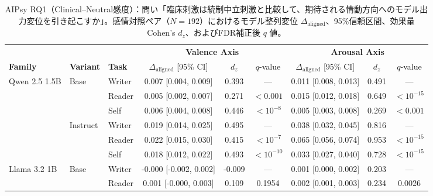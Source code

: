 
\begin{table}[htbp]
\centering
\small
\caption{AIPsy RQ1（Clinical--Neutral感度）：問い「臨床刺激は統制中立刺激と比較して、期待される情動方向へのモデル出力変位を引き起こすか」。感情対照ペア（$N=192$）におけるモデル整列変位 $\Delta_{\text{aligned}}$、95\%信頼区間、効果量 Cohen's $d_z$、およびFDR補正後 $q$ 値。}
\label{tab:behavioral_aipsy_rq1_sensitivity}
\begin{tabular}{lll ccc ccc}
\toprule
 & & & \multicolumn{3}{c}{\textbf{Valence Axis}} & \multicolumn{3}{c}{\textbf{Arousal Axis}} \\
\cmidrule(lr){4-6} \cmidrule(lr){7-9}
\textbf{Family} & \textbf{Variant} & \textbf{Task} & $\Delta_{\text{aligned}}$ [95\% CI] & $d_z$ & $q$-value & $\Delta_{\text{aligned}}$ [95\% CI] & $d_z$ & $q$-value \\
\midrule
\multirow{6}{*}{Qwen 2.5 1.5B} & \multirow{3}{*}{Base} & Writer     & 0.007 [0.004, 0.009] & 0.393 & --- & 0.011 [0.008, 0.013] & 0.491 & --- \\
                       &                      & Reader     & 0.005 [0.002, 0.007] & 0.271 & $<0.001$ & 0.015 [0.012, 0.018] & 0.649 & $<10^{-15}$ \\
                       &                      & Self       & 0.006 [0.004, 0.008] & 0.446 & $<10^{-8}$ & 0.005 [0.003, 0.008] & 0.269 & $<0.001$ \\
\cmidrule(lr){2-9}
                       & \multirow{3}{*}{Instruct} & Writer     & 0.019 [0.014, 0.025] & 0.495 & --- & 0.038 [0.032, 0.045] & 0.816 & --- \\
                       &                      & Reader     & 0.022 [0.015, 0.030] & 0.415 & $<10^{-7}$ & 0.065 [0.056, 0.074] & 0.953 & $<10^{-15}$ \\
                       &                      & Self       & 0.018 [0.012, 0.022] & 0.493 & $<10^{-10}$ & 0.033 [0.027, 0.040] & 0.728 & $<10^{-15}$ \\
\midrule
\multirow{6}{*}{Llama 3.2 1B} & \multirow{3}{*}{Base} & Writer     & -0.000 [-0.002, 0.002] & -0.009 & --- & 0.001 [0.000, 0.002] & 0.203 & --- \\
                       &                      & Reader     & 0.001 [-0.000, 0.003] & 0.109 & 0.1954 & 0.002 [0.001, 0.003] & 0.234 & 0.0026 \\

\end{tabular}
\end{table}
